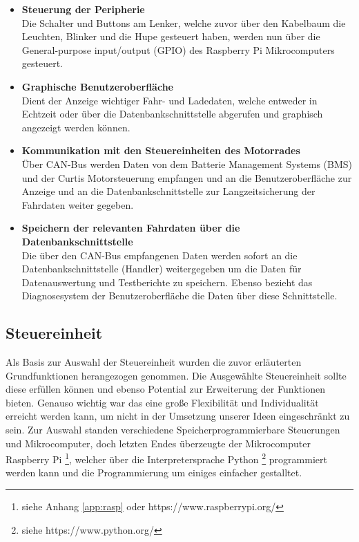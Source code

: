 \begin{itemize}

	\item \textbf{Steuerung der Peripherie} \medskip\\
	Die Schalter und Buttons am Lenker, welche zuvor über den Kabelbaum die Leuchten, Blinker und die Hupe gesteuert haben, werden nun über die General-purpose input/output (GPIO) des Raspberry Pi Mikrocomputers gesteuert.

	\item \textbf{Graphische Benutzeroberfläche}\medskip\\
Dient der Anzeige wichtiger Fahr- und Ladedaten, welche entweder in Echtzeit oder über die Datenbankschnittstelle abgerufen und graphisch angezeigt werden können.

	\item \textbf{Kommunikation mit den Steuereinheiten des Motorrades} \medskip\\
	Über CAN-Bus werden Daten von dem Batterie Management Systems (BMS) und der Curtis Motorsteuerung empfangen und an die Benutzeroberfläche zur Anzeige und an die Datenbankschnittstelle zur Langzeitsicherung der Fahrdaten weiter gegeben.

	\item \textbf{Speichern der relevanten Fahrdaten über die Datenbankschnittstelle} \medskip\\
Die über den CAN-Bus empfangenen Daten werden sofort an die Datenbankschnittstelle (Handler) weitergegeben um die Daten für Datenauswertung und Testberichte zu speichern. Ebenso bezieht das Diagnosesystem der Benutzeroberfläche die Daten über diese Schnittstelle.

\end{itemize}

\newpage

\subsection{Steuereinheit}

Als Basis zur Auswahl der Steuereinheit wurden die zuvor erläuterten Grundfunktionen herangezogen genommen. Die Ausgewählte Steuereinheit sollte diese erfüllen können und ebenso Potential zur Erweiterung der Funktionen bieten. Genauso wichtig war das eine große Flexibilität und Individualität erreicht werden kann, um nicht in der Umsetzung unserer Ideen eingeschränkt zu sein. Zur Auswahl standen verschiedene Speicherprogrammierbare Steuerungen und Mikrocomputer, doch letzten Endes überzeugte der Mikrocomputer Raspberry Pi \footnote{siehe Anhang \ref{app:rasp} oder  https://www.raspberrypi.org/}, welcher über die Interpretersprache Python \footnote{siehe https://www.python.org/} programmiert werden kann und die Programmierung um einiges einfacher gestalltet.

